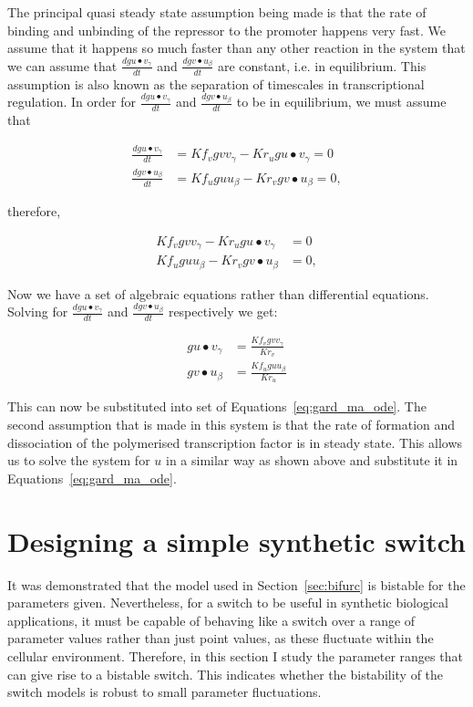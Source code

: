 The principal quasi steady state assumption being made is that the rate of binding and unbinding of the repressor to the promoter happens very fast. We assume that it happens so much faster than any other reaction in the system that we can assume that $\frac{dgu\bullet v_γ}{dt}$ and $\frac{dgv\bullet u_β}{dt}$ are constant, i.e. in equilibrium. This assumption is also known as the separation of timescales in transcriptional regulation. In order for $\frac{dgu\bullet v_γ}{dt}$ and $\frac{dgv\bullet u_β}{dt}$ to be in equilibrium, we must assume that

\begin{align}
	\frac{dgu\bullet v_γ}{dt} &= Kf_{v}gv v_{γ} - Kr_{u}gu\bullet v_γ = 0\\
	\frac{dgv\bullet u_β}{dt} &= Kf_{u}gu u_{β} - Kr_{v}gv\bullet u_β = 0,
\end{align}

\noindent therefore,

\begin{align}
	Kf_{v}gv v_{γ} - Kr_{u}gu\bullet  v_γ &= 0\\
	Kf_{u}gu u_{β} - Kr_{v}gv\bullet  u_β &= 0,
\end{align}

\noindent Now we have a set of algebraic equations rather than differential equations. Solving for $\frac{dgu\bullet v_γ}{dt}$ and $\frac{dgv\bullet u_β}{dt}$  respectively we get:

\begin{align}
	gu\bullet  v_γ &= \frac{Kf_{v}gv v_{γ}}{Kr_{v}} \\
	gv\bullet  u_β &= \frac{Kf_{u}gu u_{β}}{Kr_{u}} 
\end{align}

\noindent This can now be substituted into set of Equations~\ref{eq:gard_ma_ode}. The second assumption that is made in this system is that the rate of formation and dissociation of the polymerised transcription factor is in steady state. This allows us to solve the system for $u$ in a similar way as shown above and substitute it in Equations~\ref{eq:gard_ma_ode}.

\section{Designing a simple synthetic switch}
\label{sec:design_sim}

It was demonstrated that the model used in Section~\ref{sec:bifurc} is bistable for the parameters given. Nevertheless, for a switch to be useful in synthetic biological applications, it must be capable of behaving like a switch over a range of parameter values rather than just point values, as these fluctuate within the cellular environment. Therefore, in this section I study the parameter ranges that can give rise to a bistable switch. This indicates whether the bistability of the switch models is robust to small parameter fluctuations.


